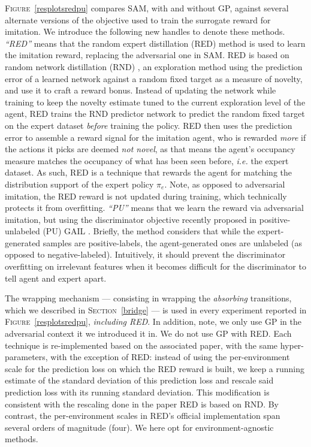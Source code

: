 \textsc{Figure}~\ref{resplotsredpu} compares SAM,
with and without GP,
against several alternate versions of the objective used
to train the surrogate reward for imitation.
We introduce the following new handles to denote these methods.
\textit{``RED''} means that the random expert distillation (RED) \cite{Wang2019-pd}
method is used to learn the imitation reward, replacing the adversarial one in SAM.
RED is based on random network distillation (RND) \cite{Burda2018-vl},
an exploration method using the prediction error of a learned network against a random fixed target
as a measure of novelty, and use it to craft a reward bonus.
Instead of updating the network while training to keep the novelty estimate tuned to
the current exploration level of the agent, RED trains the RND predictor network
to predict the random fixed target on the expert dataset \emph{before} training the policy.
RED then uses the prediction error to assemble a reward signal for the imitation agent,
who is rewarded \emph{more} if the actions it picks are deemed \emph{not novel},
as that means the agent's occupancy measure matches the occupancy of what has been seen before,
\textit{i.e.} the expert dataset. As such, RED is a technique that rewards the agent for
matching the distribution support of the expert policy $\pi_e$.
Note, as opposed to adversarial imitation, the RED reward is not updated during training,
which technically protects it from overfitting.
\textit{``PU''} means that we learn the reward via adversarial
imitation, but using the discriminator objective
recently proposed in positive-unlabeled (PU) GAIL \cite{Xu2019-uo}.
Briefly, the method considers that while the expert-generated samples
are positive-labels,
the agent-generated ones are unlabeled (as opposed to negative-labeled).
Intuitively, it should prevent the discriminator overfitting on irrelevant features
when it becomes difficult for the discriminator to tell agent and expert apart.

The wrapping mechanism
--- consisting in wrapping the \emph{absorbing} transitions,
which we described in \textsc{Section}~\ref{bridge} ---
is used in every experiment reported in \textsc{Figure}~\ref{resplotsredpu},
\emph{including RED}.
In addition, note, we only use GP in the adversarial context it we introduced it in.
We do not use GP with RED.
Each technique is re-implemented based on the associated paper,
with the same hyper-parameters, with the exception of RED:
instead of using the per-environment scale for the prediction loss on which the
RED reward is built, we keep a running estimate of the standard deviation of this
prediction loss and rescale said prediction loss with its running standard deviation.
This modification is consistent with the rescaling done in
the paper RED is based on RND.
By contrast, the per-environment scales in RED's official implementation
span several orders of magnitude (four).
We here opt for environment-agnostic methods.


